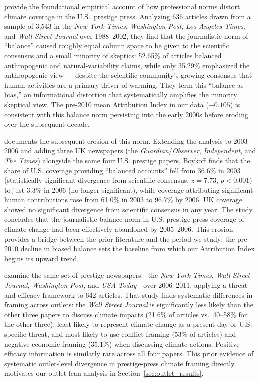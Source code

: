 \documentclass[12pt]{article}
\begin{document}
\citet{boykoff2004} provide the foundational empirical account of how
professional norms distort climate coverage in the U.S.\ prestige press.
Analyzing 636 articles drawn from a sample of 3,543 in the \emph{New
York Times}, \emph{Washington Post}, \emph{Los Angeles Times}, and
\emph{Wall Street Journal} over 1988--2002, they find that the
journalistic norm of ``balance'' caused roughly equal column space to be
given to the scientific consensus and a small minority of skeptics:
52.65\% of articles balanced anthropogenic and natural-variability
claims, while only 35.29\% emphasized the anthropogenic view --- despite
the scientific community's growing consensus that human activities are a
primary driver of warming.  They term this ``balance as bias,'' an
informational distortion that systematically amplifies the minority
skeptical view.  The pre-2010 mean Attribution Index in our data
($-0.105$) is consistent with this balance norm persisting into the early
2000s before eroding over the subsequent decade.

\citet{boykoff2007} documents the subsequent erosion of this norm.
Extending the analysis to 2003--2006 and adding three UK newspapers
(the \emph{Guardian}/\emph{Observer}, \emph{Independent}, and \emph{The
Times}) alongside the same four U.S. prestige papers, Boykoff finds that
the share of U.S. coverage providing ``balanced accounts'' fell
from 36.6\% in 2003 (statistically significant divergence from scientific
consensus, $z = 7.73$, $p<0.001$) to just 3.3\% in 2006 (no longer
significant), while coverage attributing significant human contributions
rose from 61.0\% in 2003 to 96.7\% by 2006.  UK coverage showed no
significant divergence from scientific consensus in any year.  The study
concludes that the journalistic balance norm in U.S. prestige-press
coverage of climate change had been effectively abandoned by 2005--2006.
This erosion provides a bridge between the prior literature and the
period we study: the pre-2010 decline in biased balance sets the
baseline from which our Attribution Index begins its upward trend.

\citet{feldman2017} examine the same set of prestige newspapers---the
\emph{New York Times}, \emph{Wall Street Journal}, \emph{Washington
Post}, and \emph{USA Today}---over 2006--2011, applying a
threat-and-efficacy framework to 642 articles.  That study finds
systematic differences in framing across outlets: the \emph{Wall Street
Journal} is significantly less likely than the other three papers to
discuss climate impacts (21.6\% of articles vs.\ 40--58\% for the other
three), least likely to represent climate change as a present-day or
U.S.-specific threat, and most likely to use conflict framing (53\% of
articles) and negative economic framing (35.1\%) when discussing climate
actions.  Positive efficacy information is similarly rare across all four
papers.  This prior evidence of systematic outlet-level divergence in
prestige-press climate framing directly motivates our outlet-lean
analysis in Section~\ref{sec:outlet_results}.
\end{document}

